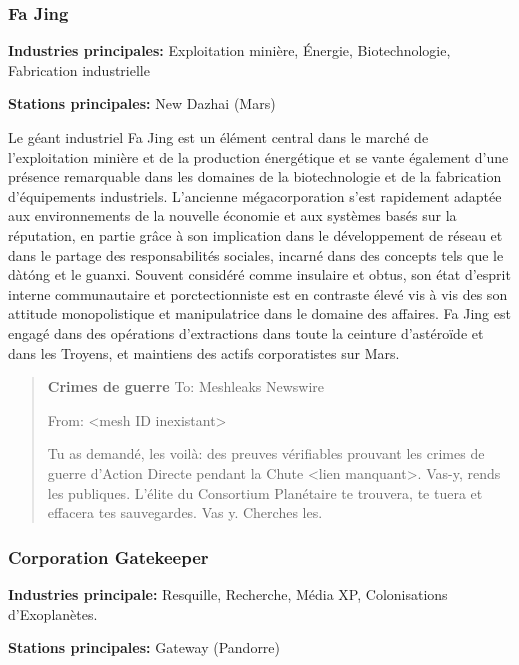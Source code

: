 \subsubsection{Fa Jing} \label{sec:fa-jing} 

\textbf{Industries principales:} Exploitation minière, Énergie, Biotechnologie, Fabrication industrielle 

\textbf{Stations principales:} New Dazhai (Mars) 

Le géant industriel Fa Jing est un élément central dans le marché de l'exploitation minière et de la production énergétique et se vante également d'une présence remarquable dans les domaines de la biotechnologie et de la fabrication d'équipements industriels. L'ancienne mégacorporation s'est rapidement adaptée aux environnements de la nouvelle économie et aux systèmes basés sur la réputation, en partie grâce à son implication dans le développement de réseau et dans le partage des responsabilités sociales, incarné dans des concepts tels que le dàtóng et le guanxi. Souvent considéré comme insulaire et obtus, son état d'esprit interne communautaire et porctectionniste est en contraste élevé vis à vis des son attitude monopolistique et manipulatrice dans le domaine des affaires. Fa Jing est engagé dans des opérations d'extractions dans toute la ceinture d'astéroïde et dans les Troyens, et maintiens des actifs corporatistes sur Mars. 

\begin{quotation} \textbf{Crimes de guerre} To: Meshleaks Newswire 

From: <mesh ID inexistant> 

Tu as demandé, les voilà: des preuves vérifiables prouvant les crimes de guerre d'Action Directe pendant la Chute <lien manquant>. Vas-y, rends les publiques. L'élite du Consortium Planétaire te trouvera, te tuera et effacera tes sauvegardes. Vas y. Cherches les. \end{quotation} 

\subsubsection{Corporation Gatekeeper} \label{sec:gatek-corp} 

\textbf{Industries principale:} Resquille, Recherche, Média XP, Colonisations d'Exoplanètes. 

\textbf{Stations principales:} Gateway (Pandorre) 

